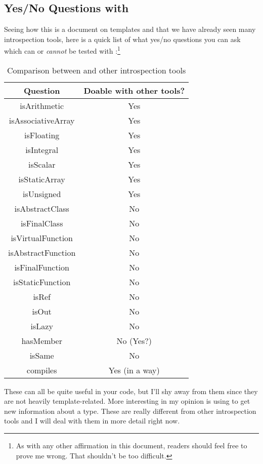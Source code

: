 \subsection{\texorpdfstring{Yes/No Questions with }
                           {Yes/No Questions with \_\_traits}}
\label{yesnoquestionsontypes}

Seeing how this is a document on templates and that we have already seen many introspection tools, here is a quick list of what yes/no questions you can ask which can or \emph{cannot} be tested with :\footnote{As with any other affirmation in this document, readers should feel free to prove me wrong. That shouldn't be too difficult.}

\begin{table}[htb]
\centering
\begin{tabular}[c]{|c|c|}
\hline
Question & Doable with other tools? \\
\hline
\hline
isArithmetic & Yes \\
isAssociativeArray & Yes \\
isFloating & Yes \\
isIntegral & Yes \\
isScalar & Yes \\
isStaticArray & Yes \\
isUnsigned & Yes \\
\hline
\hline
isAbstractClass & No \\
isFinalClass & No \\
isVirtualFunction & No \\
isAbstractFunction & No \\
isFinalFunction & No \\
isStaticFunction & No \\
\hline
\hline
isRef & No \\
isOut & No \\
isLazy & No \\
\hline
\hline
hasMember & No (Yes?) \\
isSame & No \\
compiles & Yes (in a way) \\
\hline
\end{tabular}
\caption{Comparison between  and other introspection tools}
\label{table:traits}
\end{table}

These can all be quite useful in your code, but I'll shy away from them since they are not heavily template-related. More interesting in my opinion is using  to get new information about a type. These are really different from other introspection tools and I will deal with them in more detail right now.

